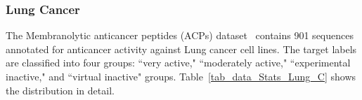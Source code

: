 \documentclass[]{Liebert_Author_revised}
\begin{document}



\subsubsection{Lung Cancer}
The Membranolytic anticancer peptides (ACPs) dataset~\citeauthor{Grisoni2019} contains 901 sequences annotated for anticancer activity against Lung cancer cell lines.  The target labels are classified into four groups: ``very active," ``moderately active," ``experimental inactive," and ``virtual inactive" groups. Table~\ref{tab_data_Stats_Lung_C} shows the distribution in detail.
\end{document}
